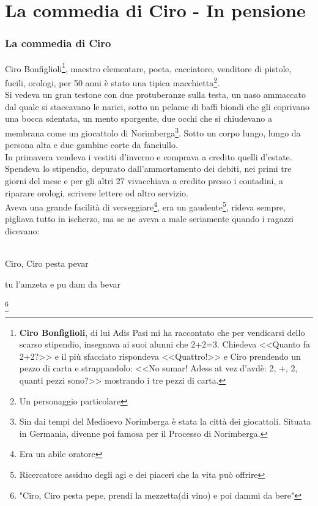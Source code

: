 
\chapter{La commedia di Ciro - In pensione}
\subsection{La commedia di Ciro}
Ciro Bonfiglioli\footnote{\textbf{Ciro Bonfiglioli}, di lui Adis Pasi mi ha raccontato che per vendicarsi dello scarso stipendio, insegnava ai suoi alunni che 2+2=3. Chiedeva <<Quanto fa 2+2?>> e il più sfacciato rispondeva <<Quattro!>> e Ciro prendendo un pezzo di carta e strappandolo: <<No sumar! Adess at vez d'avdè: 2, +, 2, quanti pezzi sono?>> mostrando i tre pezzi di carta.}, maestro elementare, poeta, cacciatore, venditore di pistole, fucili, orologi, per 50 anni è stato una tipica macchietta\footnote{Un personaggio particolare}.\\
\indent Si vedeva un gran testone con due protuberanze sulla testa, un naso ammaccato dal quale si staccavano le narici, sotto un pelame di baffi biondi che gli coprivano una bocca sdentata, un mento sporgente, due occhi che si chiudevano a membrana come un giocattolo di Norimberga\footnote{Sin dai tempi del Medioevo Norimberga è stata la città dei giocattoli. Situata in Germania, divenne poi famosa per il Processo di Norimberga.}. Sotto un corpo lungo, lungo da persona alta e due gambine corte da fanciullo.\\
\indent In primavera vendeva i vestiti d'inverno e comprava a credito quelli d'estate. Spendeva lo stipendio, depurato dall'ammortamento dei debiti, nei primi tre giorni del mese e per gli altri 27 vivacchiava a credito presso i contadini, a riparare orologi, scrivere lettere od altro servizio. \\

\indent Aveva una grande facilità di verseggiare\footnote{Era un abile oratore}, era un gaudente\footnote{Ricercatore assiduo degli agi e dei piaceri che la vita può offrire}, rideva sempre, pigliava tutto in ischerzo, ma se ne aveva a male seriamente quando i ragazzi dicevano: \\\\
\textcal \Huge
	\centerline{Ciro, Ciro pesta pevar}
	\centerline{tu l'amzeta e pu dam da bevar}\normalfont \normalsize\footnote{"Ciro, Ciro pesta pepe, prendi la mezzetta(di vino) e poi dammi da bere"}

